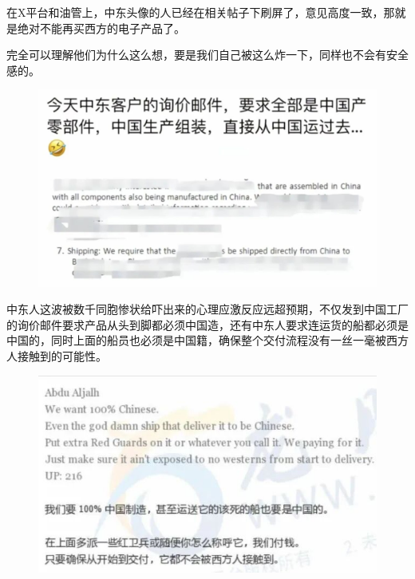 \documentclass[UTF8,11pt,oneside]{ctexart}
\begin{document}

在X平台和油管上，中东头像的人已经在相关帖子下刷屏了，意见高度一致，那就是绝对不能再买西方的电子产品了。

完全可以理解他们为什么这么想，要是我们自己被这么炸一下，同样也不会有安全感的。


\begin{figure}[H]
    \centering
    \includegraphics[width=12cm]{2024-09-21-003.jpg}
\end{figure}



中东人这波被数千同胞惨状给吓出来的心理应激反应远超预期，不仅发到中国工厂的询价邮件要求产品从头到脚都必须中国造，还有中东人要求连运货的船都必须是中国的，同时上面的船员也必须是中国籍，确保整个交付流程没有一丝一毫被西方人接触到的可能性。

\begin{figure}[H]
    \centering
    \includegraphics[width=12cm]{2024-09-21-004.jpg}
\end{figure}
\end{document}
